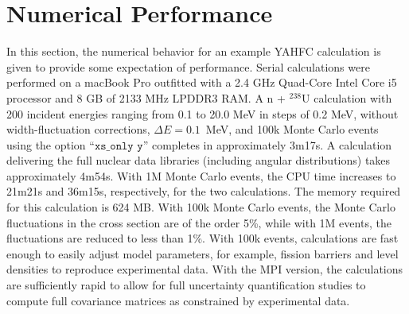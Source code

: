 \documentclass[
10pt,
showpacs,preprintnumbers,footinbib,
amsfonts,amsmath,amssymb,
aps,
prc,twocolumn,groupedaddress,superscriptaddress,
showkeys,
nofootinbib
]{revtex4-1}
\begin{document}
\section{Numerical Performance}
In this section, the numerical behavior for an example YAHFC calculation is given to provide some expectation of performance. Serial calculations were performed on a macBook Pro outfitted with a 2.4 GHz Quad-Core Intel Core i5 processor and 8 GB of 2133 MHz LPDDR3 RAM. A n + $^{238}$U calculation with 200 incident energies ranging from 0.1 to 20.0 MeV in steps of 0.2 MeV, without width-fluctuation corrections, $\Delta E = 0.1$~MeV, and 100k Monte Carlo events using the option ``${\texttt{xs\_only y}}$'' completes in approximately 3m17s. A calculation delivering the full nuclear data libraries (including angular distributions) takes approximately 4m54s. With 1M Monte Carlo events, the CPU time increases to 21m21s and 36m15s, respectively, for the two calculations. The memory required for this calculation is 624 MB. With 100k Monte Carlo events, the Monte Carlo fluctuations in the cross section are of the order 5\%, while with 1M events, the fluctuations are reduced to less than 1\%. With 100k events, calculations are fast enough to easily adjust model parameters, for example, fission barriers and level densities to reproduce experimental data. With the MPI version, the calculations are sufficiently rapid to allow for full uncertainty quantification studies to compute full covariance matrices as constrained by experimental data.

\appendix
\end{document}
